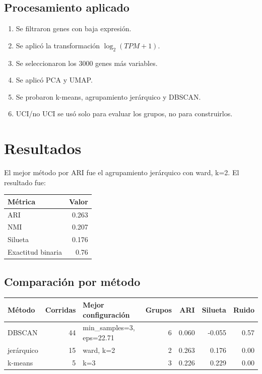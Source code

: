 \documentclass[11pt]{article}
\begin{document}
\subsection*{Procesamiento aplicado}
\begin{enumerate}
\item Se filtraron genes con baja expresión.
\item Se aplicó la transformación $\log_2(TPM + 1)$.
\item Se seleccionaron los 3000 genes más variables.
\item Se aplicó PCA y UMAP.
\item Se probaron k-means, agrupamiento jerárquico y DBSCAN.
\item UCI/no UCI se usó solo para evaluar los grupos, no para construirlos.
\end{enumerate}

\section{Resultados}
El mejor método por ARI fue el agrupamiento jerárquico con
ward, k=2. El resultado fue:

\begin{center}
\begin{tabular}{l r}
\hline
Métrica & Valor \\
\hline
ARI & 0.263 \\
NMI & 0.207 \\
Silueta & 0.176 \\
Exactitud binaria & 0.76 \\
\hline
\end{tabular}
\end{center}

\subsection*{Comparación por método}
\begin{center}
\small
\begin{tabular}{l r l r r r r}
\hline
Método & Corridas & Mejor configuración & Grupos & ARI & Silueta & Ruido \\
\hline
DBSCAN & 44 & min\_samples=3, eps=22.71 & 6 & 0.060 & -0.055 & 0.57 \\
jerárquico & 15 & ward, k=2 & 2 & 0.263 & 0.176 & 0.00 \\
k-means & 5 & k=3 & 3 & 0.226 & 0.229 & 0.00 \\
\hline
\end{tabular}
\end{center}
\end{document}
